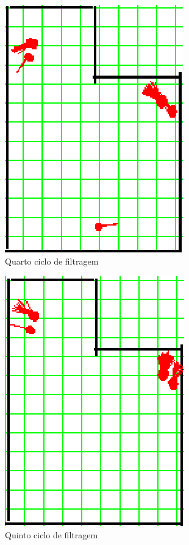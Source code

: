\begin{figure}[H]
  \centering
  \includegraphics[scale=1]{figuras/cen3_ex4/5.eps}
  \caption[Quarto Ciclo de Filtragem]{Quarto ciclo de filtragem}
  \label{img:cen3_ex4_5}
\end{figure}

\begin{figure}[H]
  \centering
  \includegraphics[scale=1]{figuras/cen3_ex4/6.eps}
  \caption[Quinto Ciclo de Filtragem]{Quinto ciclo de filtragem}
  \label{img:cen3_ex4_6}
\end{figure}

